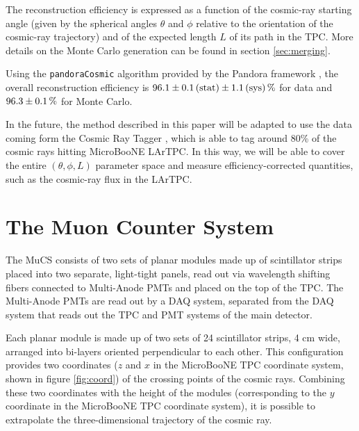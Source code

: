 \documentclass[a4paper]{scrartcl}
\begin{document}
The reconstruction efficiency is expressed as a function of the cosmic-ray starting angle (given by the spherical angles $\theta$ and $\phi$ relative to the orientation of the cosmic-ray trajectory) and of the expected length $L$ of its path in the TPC. More details on the Monte Carlo generation can be found in section \ref{sec:merging}.%

Using the \texttt{pan\-do\-ra\-Co\-smic} algorithm \cite{pandoracosmic} provided by the Pandora framework \cite{pandora}, the overall reconstruction efficiency is $96.1\pm0.1\thinspace(\mathrm{stat}) \pm 1.1\thinspace(\mathrm{sys})\thinspace\%$ for data and $96.3\pm0.1\thinspace\%$ for Monte Carlo.

In the future, the method described in this paper will be adapted to use the data coming form the Cosmic Ray Tagger \cite{crt}, which is able to tag around 80\% of the cosmic rays hitting MicroBooNE LArTPC. In this way, we will be able to cover the entire $(\theta,\phi,L)$ parameter space and measure efficiency-corrected quantities, such as the cosmic-ray flux in the LArTPC.

\section{The Muon Counter System}\label{sec:proc}
The MuCS consists of two sets of planar modules made up of scintillator strips placed into two separate, light-tight panels, read out via wavelength shifting fibers connected to Multi-Anode PMTs and placed on the top of the TPC. The Multi-Anode PMTs are read out by a DAQ system, separated from the DAQ system that reads out the TPC and PMT systems of the main detector.

Each planar module is made up of two sets of 24 scintillator strips, 4 cm wide, arranged into bi-layers oriented perpendicular to each other. This configuration provides two coordinates ($z$ and $x$ in the MicroBooNE TPC coordinate system, shown in figure \ref{fig:coord}) of the crossing points of the cosmic rays. Combining these two coordinates with the height of the modules (corresponding to the $y$ coordinate in the MicroBooNE TPC coordinate system), it is possible to extrapolate the three-dimensional trajectory of the cosmic ray.
\end{document}
